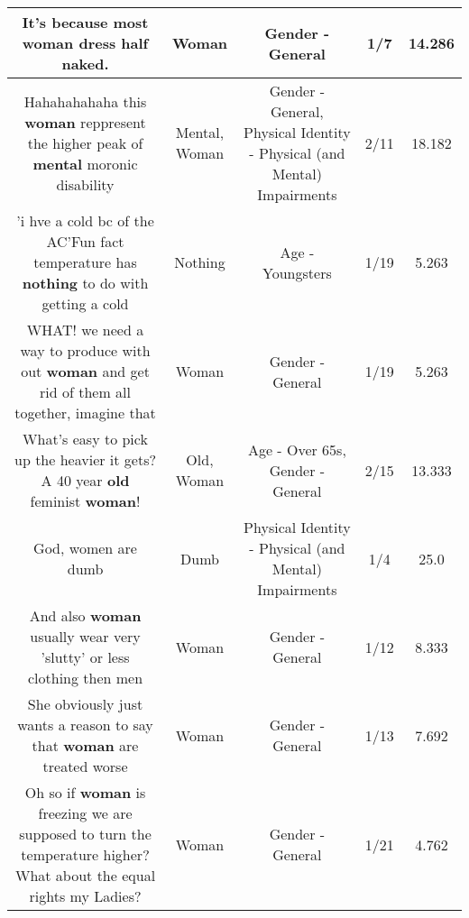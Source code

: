 \documentclass[11pt]{article}
\newlength\mylength
\begin{document}
\begin{center}
\begin{longtable}{|C{.65\mylength}|C{.30\mylength}|C{.12\mylength}|C{.12\mylength}|C{.12\mylength}|}
  \small It's because most \textbf{woman} dress half naked.\normalsize   & Woman & Gender - General & 1/7 & 14.286 \\  \hline
  \small Hahahahahaha  this \textbf{woman} reppresent the higher peak of \textbf{mental} moronic disability\normalsize   & Mental, Woman & Gender - General, Physical Identity - Physical (and Mental) Impairments & 2/11 & 18.182 \\  \hline
  \small 'i hve a cold bc of the AC'Fun fact temperature has \textbf{nothing} to do with getting a cold\normalsize   & Nothing & Age - Youngsters & 1/19 & 5.263 \\  \hline
  \small WHAT! we need a way to produce with out \textbf{woman} and get rid of them all together, imagine that\normalsize   & Woman & Gender - General & 1/19 & 5.263 \\  \hline
  \small What's easy to pick up the heavier it gets?A 40 year \textbf{old} feminist \textbf{woman}!\normalsize   & Old, Woman & Age - Over 65s, Gender - General & 2/15 & 13.333 \\  \hline
  \small God, women are dumb\normalsize   & Dumb & Physical Identity - Physical (and Mental) Impairments & 1/4 & 25.0 \\  \hline
  \small And also \textbf{woman} usually wear very 'slutty' or less clothing then men\normalsize   & Woman & Gender - General & 1/12 & 8.333 \\  \hline
  \small She obviously just wants a reason to say that \textbf{woman} are treated worse\normalsize   & Woman & Gender - General & 1/13 & 7.692 \\  \hline
  \small Oh so if \textbf{woman} is freezing we are supposed to turn the temperature higher? What about the equal rights my Ladies?\normalsize   & Woman & Gender - General & 1/21 & 4.762 \\  \hline

\end{longtable}
\end{center}
\end{document}
